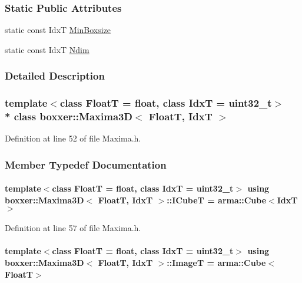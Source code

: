 \subsubsection*{Static Public Attributes}
\begin{DoxyCompactItemize}
\item 
static const IdxT \hyperlink{classboxxer_1_1Maxima3D_a31e443fae0ba2fec7cdaebee0d207f31}{Min\+Boxsize}
\item 
static const IdxT \hyperlink{classboxxer_1_1Maxima3D_ae446af4adb99b87f2211f3b4d83b6273}{Ndim}
\end{DoxyCompactItemize}


\subsubsection{Detailed Description}
\subsubsection*{template$<$class FloatT = float, class IdxT = uint32\+\_\+t$>$\\*
class boxxer\+::\+Maxima3\+D$<$ Float\+T, Idx\+T $>$}



Definition at line 52 of file Maxima.\+h.



\subsubsection{Member Typedef Documentation}
\paragraph[{\texorpdfstring{I\+CubeT}{ICubeT}}]{\setlength{\rightskip}{0pt plus 5cm}template$<$class FloatT  = float, class IdxT  = uint32\+\_\+t$>$ using {\bf boxxer\+::\+Maxima3D}$<$ FloatT, IdxT $>$\+::{\bf I\+CubeT} =  arma\+::\+Cube$<$IdxT$>$}\hypertarget{classboxxer_1_1Maxima3D_af84c08251794d634d33f2b388d465724}{}\label{classboxxer_1_1Maxima3D_af84c08251794d634d33f2b388d465724}


Definition at line 57 of file Maxima.\+h.

\paragraph[{\texorpdfstring{ImageT}{ImageT}}]{\setlength{\rightskip}{0pt plus 5cm}template$<$class FloatT  = float, class IdxT  = uint32\+\_\+t$>$ using {\bf boxxer\+::\+Maxima3D}$<$ FloatT, IdxT $>$\+::{\bf ImageT} =  arma\+::\+Cube$<$FloatT$>$}\hypertarget{classboxxer_1_1Maxima3D_aebf2125d25bccd44361a369831600569}{}\label{classboxxer_1_1Maxima3D_aebf2125d25bccd44361a369831600569}


